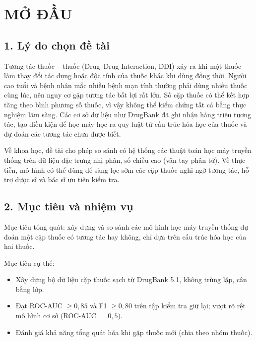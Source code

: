 \documentclass[12pt,a4paper,oneside]{report}
\newcommand{\unnumberedchapter}[1]{%
  \chapter*{#1}\phantomsection\addcontentsline{toc}{chapter}{#1}\markboth{#1}{}}
\begin{document}
\clearpage
{}
\pagestyle{fancy}

\unnumberedchapter{MỞ ĐẦU}

\section*{1. Lý do chọn đề tài}
Tương tác thuốc -- thuốc (Drug--Drug Interaction, DDI) xảy ra khi một thuốc làm
thay đổi tác dụng hoặc độc tính của thuốc khác khi dùng đồng thời. Người cao
tuổi và bệnh nhân mắc nhiều bệnh mạn tính thường phải dùng nhiều thuốc cùng
lúc, nên nguy cơ gặp tương tác bất lợi rất lớn. Số cặp thuốc có thể kết hợp
tăng theo bình phương số thuốc, vì vậy không thể kiểm chứng tất cả bằng thực
nghiệm lâm sàng. Các cơ sở dữ liệu như DrugBank \cite{wishart2018} đã ghi nhận
hàng triệu tương tác, tạo điều kiện để học máy học ra quy luật từ cấu trúc hóa
học của thuốc và dự đoán các tương tác chưa được biết.

Về khoa học, đề tài cho phép so sánh có hệ thống các thuật toán học máy truyền
thống trên dữ liệu đặc trưng nhị phân, số chiều cao (vân tay phân tử). Về thực
tiễn, mô hình có thể dùng để sàng lọc sớm các cặp thuốc nghi ngờ tương tác,
hỗ trợ dược sĩ và bác sĩ ưu tiên kiểm tra.

\section*{2. Mục tiêu và nhiệm vụ}
Mục tiêu tổng quát: xây dựng và so sánh các mô hình học máy truyền
thống dự đoán một cặp thuốc có tương tác hay không, chỉ dựa trên cấu trúc hóa
học của hai thuốc.

Mục tiêu cụ thể:
\begin{itemize}
  \item Xây dựng bộ dữ liệu cặp thuốc sạch từ DrugBank 5.1, không trùng lặp, cân bằng lớp.
  \item Đạt ROC-AUC $\geq 0{,}85$ và F1 $\geq 0{,}80$ trên tập kiểm tra giữ lại;
        vượt rõ rệt mô hình cơ sở (ROC-AUC $=0{,}5$).
  \item Đánh giá khả năng tổng quát hóa khi gặp thuốc mới (chia theo nhóm thuốc).
\end{itemize}
\end{document}
